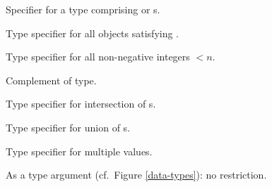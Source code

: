 \begin{LIST}{1cm}
  {
  Specifier for a type comprising  or s.
  }

  {
  Type specifier for all objects satisfying . 
  }

  {
  Type specifier for all non-negative integers $<n$.
  }

  {
  Complement of type.
  }

  {
  Type specifier for intersection of s.
  }

  {
  Type specifier for union of s.
  }

  {
  Type specifier for multiple values.
  }

  \IT{\kwd{\A}}
  {
    As a type argument (cf.\ Figure \ref{data-types}): no restriction.
  }
  \end{LIST}




